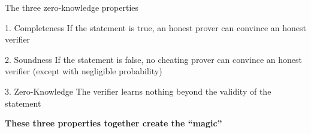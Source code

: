 \documentclass[aspectratio=169, lualatex, handout]{beamer}
\begin{document}
\begin{frame}{The three zero-knowledge properties}
	\begin{block}{1. Completeness}
		If the statement is true, an honest prover can convince an honest verifier
	\end{block}
	\begin{block}{2. Soundness}
		If the statement is false, no cheating prover can convince an honest verifier (except with negligible probability)
	\end{block}
	\begin{block}{3. Zero-Knowledge}
		The verifier learns nothing beyond the validity of the statement
	\end{block}
	\vspace{0.25em}
	\begin{center}
		\textbf{These three properties together create the ``magic''}
	\end{center}
\end{frame}
\end{document}

